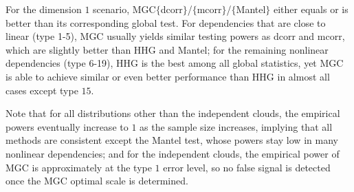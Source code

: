 \documentclass[11pt]{article}
\begin{document}
For the dimension $1$ scenario, MGC$\{$dcorr$\}$/$\{$mcorr$\}$/$\{$Mantel$\}$ either equals or is better than its corresponding global test. For dependencies that are close to linear (type 1-5), MGC usually yields similar testing powers as dcorr and mcorr, which are slightly better than HHG and Mantel; for the remaining nonlinear dependencies (type 6-19), HHG is the best among all global statistics, yet MGC is able to achieve similar or even better performance than HHG in almost all cases except type $15$. 

Note that for all distributions other than the independent clouds, the empirical powers eventually increase to $1$ as the sample size increases, implying that all methods are consistent except the Mantel test, whose powers stay low in many nonlinear dependencies; and for the independent clouds, the empirical power of MGC is approximately at the type $1$ error level, so no false signal is detected once the MGC optimal scale is determined. 
\end{document}
